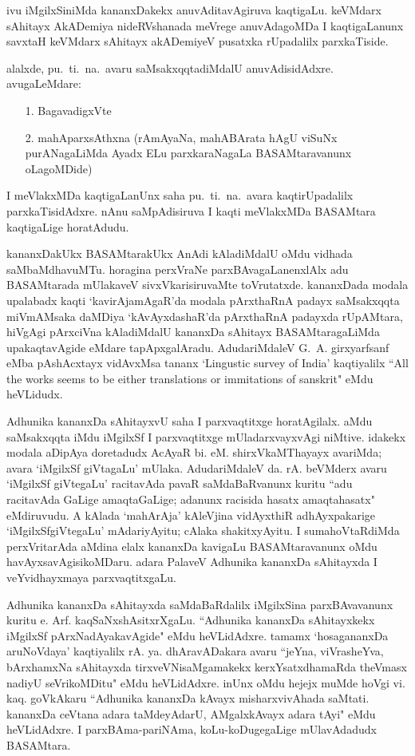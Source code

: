 ivu iMgilxSiniMda kananxDakekx anuvAditavAgiruva kaqtigaLu. keVMdarx sAhitayx AkADemiya nideRVshanada meVrege anuvAdagoMDa I kaqtigaLanunx savxtaH keVMdarx sAhitayx akADemiyeV pusatxka rUpadalilx parxkaTiside.

alalxde, pu.~ti.~na.~avaru saMsakxqqtadiMdalU anuvAdisidAdxre. avugaLeMdare:
\begin{itemize}
\item[1.] BagavadigxVte
\item[2.] mahAparxsAthxna (rAmAyaNa, mahABArata hAgU viSuNx purANagaLiMda Ayadx ELu parxkaraNagaLa BASAMtaravanunx oLagoMDide)
\end{itemize}

I meVlakxMDa kaqtigaLanUnx saha pu.~ti.~na.~avara kaqtirUpadalilx parxkaTisidAdxre. nAnu saMpAdisiruva I kaqti meVlakxMDa BASAMtara kaqtigaLige horatAdudu.

kananxDakUkx BASAMtarakUkx AnAdi kAladiMdalU oMdu vidhada saMbaMdhavuMTu. horagina perxVraNe parxBAvagaLanenxlAlx adu BASAMtarada mUlakaveV sivxVkarisiruvaMte toVrutatxde. kananxDada modala upalabadx kaqti `kavirAjamAgaR'da modala pArxthaRnA padayx saMsakxqqta miVmAMsaka daMDiya `kAvAyxdashaR'da pArxthaRnA padayxda rUpAMtara, hiVgAgi pArxciVna kAladiMdalU kananxDa sAhitayx BASAMtaragaLiMda upakaqtavAgide eMdare tapApxgalAradu. AdudariMdaleV {\rm G.~A.} girxyarfsanf eMba pAshAcxtayx vidAvxMsa tananx {\rm `Lingustic survey of India'} kaqtiyalilx {\rm ``All the works seems to be either translations or immitations of sanskrit"} eMdu heVLidudx.

Adhunika kananxDa sAhitayxvU saha I parxvaqtitxge horatAgilalx. aMdu saMsakxqqta iMdu iMgilxSf I parxvaqtitxge mUladarxvayxvAgi niMtive. idakekx modala aDipAya doretadudx AcAyaR bi. eM. shirxVkaMThayayx avariMda; avara `iMgilxSf giVtagaLu' mUlaka. AdudariMdaleV da. rA. beVMderx avaru `iMgilxSf giVtegaLu' racitavAda pavaR saMdaBaRvanunx kuritu ``adu racitavAda  GaLige amaqtaGaLige; adanunx racisida hasatx amaqtahasatx" eMdiruvudu. A kAlada `mahArAja' kAleVjina vidAyxthiR adhAyxpakarige `iMgilxSfgiVtegaLu' mAdariyAyitu; cAlaka shakitxyAyitu. I sumahoVtaRdiMda perxVritarAda aMdina elalx kananxDa kavigaLu BASAMtaravanunx oMdu havAyxsavAgisikoMDaru. adara PalaveV Adhunika kananxDa sAhitayxda I veYvidhayxmaya parxvaqtitxgaLu.

Adhunika kananxDa sAhitayxda saMdaBaRdalilx iMgilxSina parxBAvavanunx kuritu e. Arf. kaqSaNxshAsitxrXgaLu. ``Adhunika kananxDa sAhitayxkekx iMgilxSf pArxNadAyakavAgide" eMdu heVLidAdxre. tamamx `hosagananxDa aruNoVdaya' kaqtiyalilx rA. ya. dhAravADakara avaru ``jeYna, viVrasheYva, bArxhamxNa sAhitayxda tirxveVNisaMgamakekx kerxYsatxdhamaRda theVmasx nadiyU seVrikoMDitu" eMdu heVLidAdxre. inUnx oMdu hejejx muMde hoVgi vi. kaq. goVkAkaru ``Adhunika kananxDa kAvayx misharxvivAhada saMtati. kananxDa ceVtana adara taMdeyAdarU, AMgalxkAvayx adara tAyi" eMdu heVLidAdxre. I parxBAma-pariNAma, koLu-koDugegaLige mUlavAdadudx BASAMtara.  

